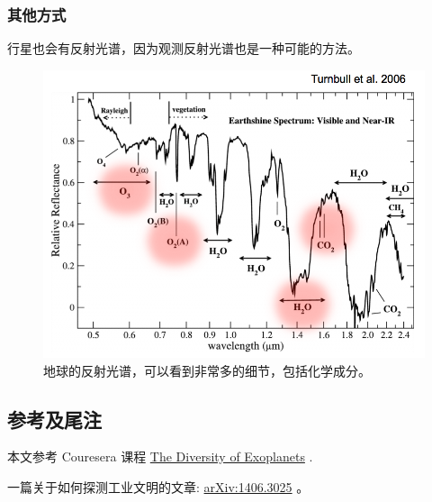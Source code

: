 \documentclass[letterpaper,10pt,english]{sphinxmanual}
\begin{document}
\subsubsection{其他方式}
\label{atmosphere:id9}
行星也会有反射光谱，因为观测反射光谱也是一种可能的方法。
\begin{figure}[htbp]
\centering
\capstart

\includegraphics{reflectance.png}
\caption{地球的反射光谱，可以看到非常多的细节，包括化学成分。}\end{figure}


\subsection{参考及尾注}
\label{atmosphere:id10}
本文参考 Couresera 课程 \href{https://class.coursera.org/extrasolarplanets-001}{The Diversity of Exoplanets} .

一篇关于如何探测工业文明的文章: \href{http://arxiv.org/abs/1406.3025}{arXiv:1406.3025} 。
\end{document}
